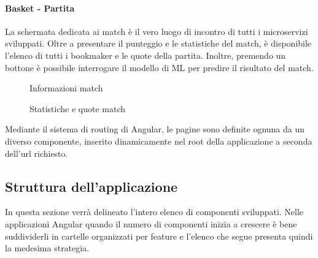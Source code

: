     \paragraph{Basket - Partita} La schermata dedicata ai match è il vero luogo di incontro di tutti i microservizi sviluppati. Oltre a presentare il punteggio e le statistiche del match, è disponibile l'elenco di tutti i bookmaker e le quote della partita. Inoltre, premendo un bottone è possibile interrogare il modello di ML per predire il risultato del match.
    \begin{figure}[H]
        \centering
        \caption{Informazioni match}
        \label{fig:enter-label}
    \end{figure}
    \begin{figure}[H]
        \centering
        \caption{Statistiche e quote match}
        \label{fig:enter-label}
    \end{figure}

Mediante il sistema di routing di Angular, le pagine sono definite ognuna da un diverso componente, inserito dinamicamente nel root della applicazione a seconda dell'url richiesto. 

\subsection{Struttura dell'applicazione}
In questa sezione verrà delineato l'intero elenco di componenti sviluppati. Nelle applicazioni Angular quando il numero di componenti inizia a crescere è bene suddividerli in cartelle organizzati per feature e l'elenco che segue presenta quindi la medesima strategia.


